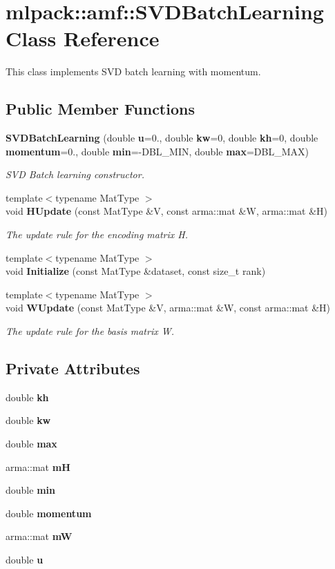 \section{mlpack\-:\-:amf\-:\-:S\-V\-D\-Batch\-Learning Class Reference}
\label{classmlpack_1_1amf_1_1SVDBatchLearning}


This class implements S\-V\-D batch learning with momentum.  


\subsection*{Public Member Functions}
\begin{DoxyCompactItemize}
\item 
{\bf S\-V\-D\-Batch\-Learning} (double {\bf u}=0., double {\bf kw}=0, double {\bf kh}=0, double {\bf momentum}=0., double {\bf min}=-\/D\-B\-L\-\_\-\-M\-I\-N, double {\bf max}=D\-B\-L\-\_\-\-M\-A\-X)
\begin{DoxyCompactList}\small\item\em S\-V\-D Batch learning constructor. \end{DoxyCompactList}\item 
{\footnotesize template$<$typename Mat\-Type $>$ }\\void {\bf H\-Update} (const Mat\-Type \&V, const arma\-::mat \&W, arma\-::mat \&H)
\begin{DoxyCompactList}\small\item\em The update rule for the encoding matrix H. \end{DoxyCompactList}\item 
{\footnotesize template$<$typename Mat\-Type $>$ }\\void {\bf Initialize} (const Mat\-Type \&dataset, const size\-\_\-t rank)
\item 
{\footnotesize template$<$typename Mat\-Type $>$ }\\void {\bf W\-Update} (const Mat\-Type \&V, arma\-::mat \&W, const arma\-::mat \&H)
\begin{DoxyCompactList}\small\item\em The update rule for the basis matrix W. \end{DoxyCompactList}\end{DoxyCompactItemize}
\subsection*{Private Attributes}
\begin{DoxyCompactItemize}
\item 
double {\bf kh}
\item 
double {\bf kw}
\item 
double {\bf max}
\item 
arma\-::mat {\bf m\-H}
\item 
double {\bf min}
\item 
double {\bf momentum}
\item 
arma\-::mat {\bf m\-W}
\item 
double {\bf u}
\end{DoxyCompactItemize}


